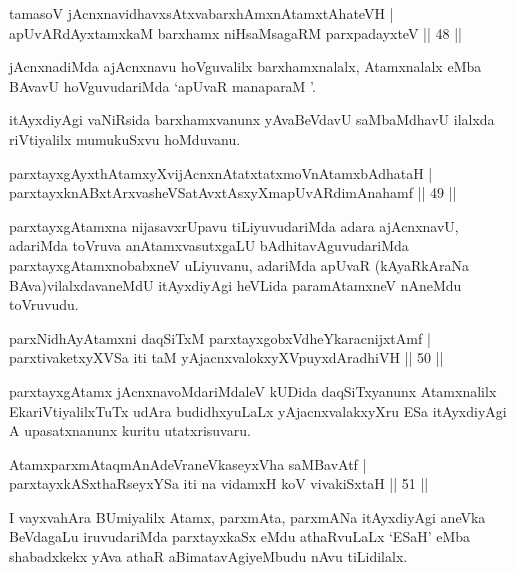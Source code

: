 \begin{shl}
tamasoV jAcnxnavidhavxsAtxvabarxhAmxnAtamxtAhateVH |\\
apUvARdAyxtamxkaM barxhamx niHsaMsagaRM parxpadayxteV \hfill || 48 ||
\end{shl}

\begin{artha}
jAcnxnadiMda ajAcnxnavu hoVguvalilx barxhamxnalalx, Atamxnalalx eMba BAvavU hoVguvudariMda `apUvaR manaparaM '.

itAyxdiyAgi vaNiRsida barxhamxvanunx yAvaBeVdavU saMbaMdhavU ilalxda riVtiyalilx mumukuSxvu hoMduvanu.
\end{artha}

\begin{shl}
parxtayxgAyxthAtamxyXvijAcnxnAtatxtatxmoVnAtamxbAdhataH |\\
parxtayxknABxtArxvasheVSatAvxtAsxyXmapUvARdimAnahamf \hfill || 49 ||
\end{shl}

\begin{artha}
parxtayxgAtamxna nijasavxrUpavu tiLiyuvudariMda adara ajAcnxnavU, adariMda toVruva anAtamxvasutxgaLU bAdhitavAguvudariMda parxtayxgAtamxnobabxneV uLiyuvanu, adariMda apUvaR (kAyaRkAraNa BAva)vilalxdavaneMdU itAyxdiyAgi heVLida paramAtamxneV nAneMdu toVruvudu.
\end{artha}

\begin{shl}
parxNidhAyA\s \s tamxni daqSiTxM parxtayxgobxVdheYkaracnijxtAmf |\\
parxtivaketxyXVSa iti taM yAjacnxvalokxyXV\s puyxdAradhiVH \hfill || 50 ||
\end{shl}

\begin{artha}%
parxtayxgAtamx jAcnxnavoMdariMdaleV kUDida daqSiTxyanunx Atamxnalilx EkariVtiyalilxTuTx udAra budidhxyuLaLx yAjacnxvalakxyXru ESa itAyxdiyAgi A upasatxnanunx kuritu utatxrisuvaru.
\end{artha}


\begin{shl}
AtamxparxmAtaqmAnAdeVraneVkaseyxVha saMBavAtf |\\
parxtayxkASxthaRseyxYSa iti na vidamxH koV vivakiSxtaH \hfill || 51 ||
\end{shl}

\begin{artha}
I vayxvahAra BUmiyalilx Atamx, parxmAta, parxmANa itAyxdiyAgi aneVka BeVdagaLu iruvudariMda parxtayxkaSx eMdu athaRvuLaLx `ESaH' eMba shabadxkekx yAva athaR aBimatavAgiyeMbudu nAvu tiLidilalx.
\end{artha}

